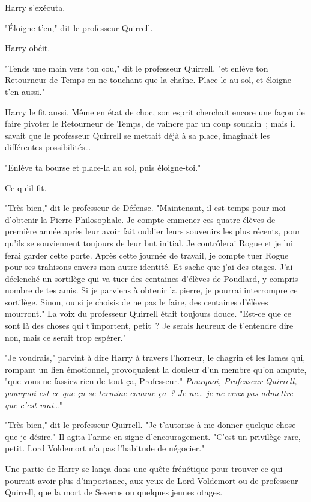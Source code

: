 Harry s'exécuta.

"Éloigne-t'en," dit le professeur Quirrell.

Harry obéit.

"Tends une main vers ton cou," dit le professeur Quirrell, "et enlève ton Retourneur de Temps en ne touchant que la chaîne. Place-le au sol, et éloigne-t'en aussi."

Harry le fit aussi. Même en état de choc, son esprit cherchait encore une façon de faire pivoter le Retourneur de Temps, de vaincre par un coup soudain~; mais il savait que le professeur Quirrell se mettait déjà à sa place, imaginait les différentes possibilités…

"Enlève ta bourse et place-la au sol, puis éloigne-toi."

Ce qu'il fit.

"Très bien," dit le professeur de Défense. "Maintenant, il est temps pour moi d'obtenir la Pierre Philosophale. Je compte emmener ces quatre élèves de première année après leur avoir fait oublier leurs souvenirs les plus récents, pour qu'ils se souviennent toujours de leur but initial. Je contrôlerai Rogue et je lui ferai garder cette porte. Après cette journée de travail, je compte tuer Rogue pour ses trahisons envers mon autre identité. Et sache que j'ai des otages. J'ai déclenché un sortilège qui va tuer des centaines d'élèves de Poudlard, y compris nombre de tes amis. Si je parviens à obtenir la pierre, je pourrai interrompre ce sortilège. Sinon, ou si je choisis de ne pas le faire, des centaines d'élèves mourront." La voix du professeur Quirrell était toujours douce. "Est-ce que ce sont là des choses qui t'importent, petit~? Je serais heureux de t'entendre dire non, mais ce serait trop espérer."

"Je voudrais," parvint à dire Harry à travers l'horreur, le chagrin et les lames qui, rompant un lien émotionnel, provoquaient la douleur d'un membre qu'on ampute, "que vous ne fassiez rien de tout ça, Professeur." \emph{Pourquoi, Professeur Quirrell, pourquoi est-ce que ça se termine comme ça~? Je ne… je ne veux pas admettre que c'est vrai…}"

"Très bien," dit le professeur Quirrell. "Je t'autorise à me donner quelque chose que je désire." Il agita l'arme en signe d'encouragement. "C'est un privilège rare, petit. Lord Voldemort n'a pas l'habitude de négocier."

Une partie de Harry se lança dans une quête frénétique pour trouver ce qui pourrait avoir plus d'importance, aux yeux de Lord Voldemort ou de professeur Quirrell, que la mort de Severus ou quelques jeunes otages.

